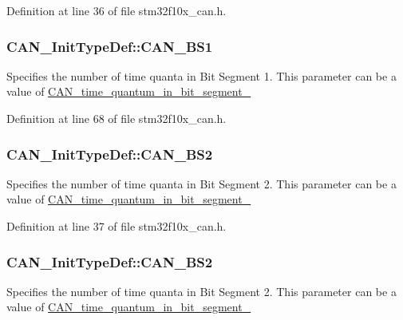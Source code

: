 Definition at line 36 of file stm32f10x\+\_\+can.\+h.

\subsubsection[{\texorpdfstring{C\+A\+N\+\_\+\+B\+S1}{CAN_BS1}}]{ C\+A\+N\+\_\+\+Init\+Type\+Def\+::\+C\+A\+N\+\_\+\+B\+S1}\hypertarget{struct_c_a_n___init_type_def_aecbd21b55dc88c3a18db93af2836cd58}{}\label{struct_c_a_n___init_type_def_aecbd21b55dc88c3a18db93af2836cd58}
Specifies the number of time quanta in Bit Segment 1. This parameter can be a value of \hyperlink{group___c_a_n__time__quantum__in__bit__segment__1}{C\+A\+N\+\_\+time\+\_\+quantum\+\_\+in\+\_\+bit\+\_\+segment\+\_} 

Definition at line 68 of file stm32f10x\+\_\+can.\+h.

\subsubsection[{\texorpdfstring{C\+A\+N\+\_\+\+B\+S2}{CAN_BS2}}]{ C\+A\+N\+\_\+\+Init\+Type\+Def\+::\+C\+A\+N\+\_\+\+B\+S2}\hypertarget{struct_c_a_n___init_type_def_afb75a15badb26140497ef75f682572aa}{}\label{struct_c_a_n___init_type_def_afb75a15badb26140497ef75f682572aa}
Specifies the number of time quanta in Bit Segment 2. This parameter can be a value of \hyperlink{group___c_a_n__time__quantum__in__bit__segment__2}{C\+A\+N\+\_\+time\+\_\+quantum\+\_\+in\+\_\+bit\+\_\+segment\+\_} 

Definition at line 37 of file stm32f10x\+\_\+can.\+h.

\subsubsection[{\texorpdfstring{C\+A\+N\+\_\+\+B\+S2}{CAN_BS2}}]{ C\+A\+N\+\_\+\+Init\+Type\+Def\+::\+C\+A\+N\+\_\+\+B\+S2}\hypertarget{struct_c_a_n___init_type_def_a693eb00830d6e2aeb4d9fabdba85b9cf}{}\label{struct_c_a_n___init_type_def_a693eb00830d6e2aeb4d9fabdba85b9cf}
Specifies the number of time quanta in Bit Segment 2. This parameter can be a value of \hyperlink{group___c_a_n__time__quantum__in__bit__segment__2}{C\+A\+N\+\_\+time\+\_\+quantum\+\_\+in\+\_\+bit\+\_\+segment\+\_} 

